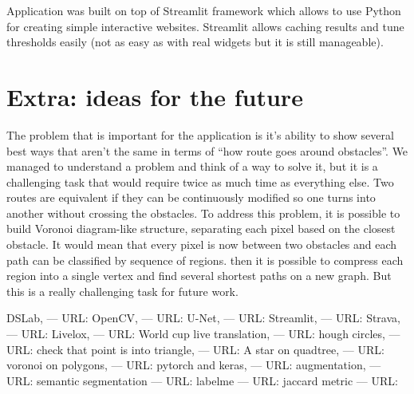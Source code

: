 \documentclass[a4paper,12pt]{extarticle}
\begin{document}
Application was built on top of Streamlit framework which allows to use Python for creating simple interactive websites. Streamlit allows caching results and tune thresholds easily (not as easy as with real widgets but it is still manageable).


\section{Extra: ideas for the future}

The problem that is important for the application is it’s ability to show several best ways that aren’t the same in terms of “how route goes around obstacles”. We managed to understand a problem and think of a way to solve it, but it is a challenging task that would require twice as much time as everything else.
Two routes are equivalent if they can be continuously modified so one turns into another without crossing the obstacles.
To address this problem, it is possible to build Voronoi diagram-like structure, separating each pixel based on the closest obstacle. It would mean that every pixel is now between two obstacles and each path can be classified by sequence of regions. then it is possible to compress each region into a single vertex and find several shortest paths on a new graph. But this is a really challenging task for future work.






\begin{thebibliography}{00}
 DSLab, --- URL: 
 OpenCV, --- URL: 
 U-Net, --- URL: 
 Streamlit, --- URL: 
 Strava, --- URL: 
 Livelox, --- URL: 
 World cup live translation, --- URL: 
 hough circles, --- URL: 
 check that point is into triangle, --- URL: 
 A star on quadtree, --- URL: 
 voronoi on polygons, --- URL: 
 pytorch and keras, --- URL: 
 augmentation, --- URL: 
 semantic segmentation --- URL: 
 labelme --- URL: 
 jaccard metric --- URL: 

\end{thebibliography}
	
	
\end{document}
